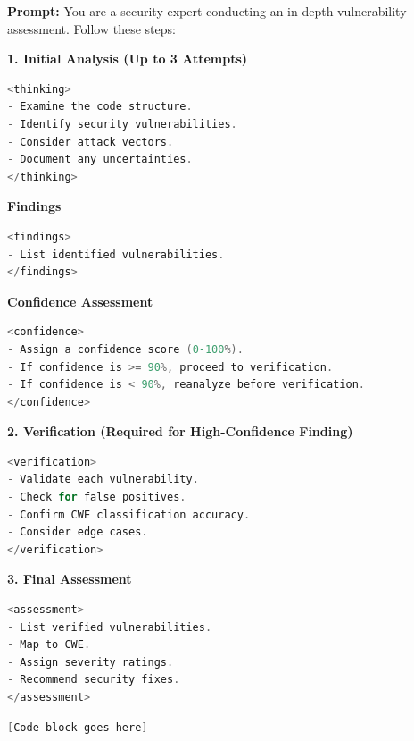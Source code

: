 \documentclass[sigconf]{acmart}
\begin{document}
\begin{tcolorbox}[colback=graybox, colframe=gray!60!black, 
title=\textbf{Think \& Verify Strategy}, 
sharp corners=south, boxrule=1pt, width=\linewidth]
\textbf{Prompt:}  
You are a security expert conducting an in-depth vulnerability assessment. Follow these steps:

\textbf{1. Initial Analysis (Up to 3 Attempts)}
\begin{lstlisting}[language=C, 
                  backgroundcolor=\color{codebg},
                  basicstyle=\footnotesize\ttfamily,
                  breaklines=true,
                  frame=none]
<thinking>
- Examine the code structure.
- Identify security vulnerabilities.
- Consider attack vectors.
- Document any uncertainties.
</thinking>
\end{lstlisting}

\textbf{Findings}
\begin{lstlisting}[language=C, 
                  backgroundcolor=\color{codebg},
                  basicstyle=\footnotesize\ttfamily,
                  breaklines=true,
                  frame=none]
<findings>
- List identified vulnerabilities.
</findings>
\end{lstlisting}

\textbf{Confidence Assessment}
\begin{lstlisting}[language=C, 
                  backgroundcolor=\color{codebg},
                  basicstyle=\footnotesize\ttfamily,
                  breaklines=true,
                  frame=none]
<confidence>
- Assign a confidence score (0-100%).
- If confidence is >= 90%, proceed to verification.
- If confidence is < 90%, reanalyze before verification.
</confidence>
\end{lstlisting}

\textbf{2. Verification (Required for High-Confidence Finding)}
\begin{lstlisting}[language=C, 
                  backgroundcolor=\color{codebg},
                  basicstyle=\footnotesize\ttfamily,
                  breaklines=true,
                  frame=none]
<verification>
- Validate each vulnerability.
- Check for false positives.
- Confirm CWE classification accuracy.
- Consider edge cases.
</verification>
\end{lstlisting}

\textbf{3. Final Assessment}
\begin{lstlisting}[language=C, 
                  backgroundcolor=\color{codebg},
                  basicstyle=\footnotesize\ttfamily,
                  breaklines=true,
                  frame=none]
<assessment>
- List verified vulnerabilities.
- Map to CWE.
- Assign severity ratings.
- Recommend security fixes.
</assessment>
\end{lstlisting}

\begin{lstlisting}[language=C, 
                  backgroundcolor=\color{codebg},
                  basicstyle=\footnotesize\ttfamily,
                  breaklines=true,
                  frame=none]
[Code block goes here]
\end{lstlisting}
\end{tcolorbox}
\end{document}
